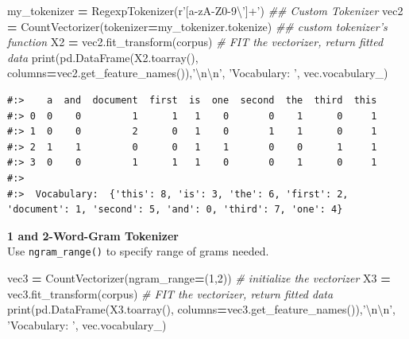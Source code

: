 \documentclass[
]{book}
\newenvironment{Shaded}{\begin{snugshade}}{\end{snugshade}}
\newcommand{\BuiltInTok}[1]{#1}
\newcommand{\CharTok}[1]{\textcolor[rgb]{0.5,0.5,0.5}{#1}}
\newcommand{\CommentTok}[1]{\textcolor[rgb]{0.37,0.37,0.37}{\textit{#1}}}
\newcommand{\DecValTok}[1]{\textcolor[rgb]{0.06,0.06,0.06}{#1}}
\newcommand{\NormalTok}[1]{#1}
\newcommand{\OperatorTok}[1]{\textcolor[rgb]{0.43,0.43,0.43}{\textbf{#1}}}
\newcommand{\StringTok}[1]{\textcolor[rgb]{0.5,0.5,0.5}{#1}}
\newcommand{\VerbatimStringTok}[1]{\textcolor[rgb]{0.5,0.5,0.5}{#1}}
\begin{document}
\begin{Shaded}
\begin{Highlighting}[]
\NormalTok{my_tokenizer }\OperatorTok{=}\NormalTok{ RegexpTokenizer(}\VerbatimStringTok{r'[a-zA-Z0-9\textbackslash{}']+'}\NormalTok{)  }\CommentTok{## Custom Tokenizer}
\NormalTok{vec2 }\OperatorTok{=}\NormalTok{ CountVectorizer(tokenizer}\OperatorTok{=}\NormalTok{my_tokenizer.tokenize) }\CommentTok{## custom tokenizer's function}
\NormalTok{X2   }\OperatorTok{=}\NormalTok{ vec2.fit_transform(corpus)  }\CommentTok{# FIT the vectorizer, return fitted data}
\BuiltInTok{print}\NormalTok{(pd.DataFrame(X2.toarray(), columns}\OperatorTok{=}\NormalTok{vec2.get_feature_names()),}\StringTok{'}\CharTok{\textbackslash{}n\textbackslash{}n}\StringTok{'}\NormalTok{,}
      \StringTok{'Vocabulary: '}\NormalTok{, vec.vocabulary_)}
\end{Highlighting}
\end{Shaded}

\begin{verbatim}
#:>    a  and  document  first  is  one  second  the  third  this
#:> 0  0    0         1      1   1    0       0    1      0     1
#:> 1  0    0         2      0   1    0       1    1      0     1
#:> 2  1    1         0      0   1    1       0    0      1     1
#:> 3  0    0         1      1   1    0       0    1      0     1 
#:> 
#:>  Vocabulary:  {'this': 8, 'is': 3, 'the': 6, 'first': 2, 'document': 1, 'second': 5, 'and': 0, 'third': 7, 'one': 4}
\end{verbatim}

\textbf{1 and 2-Word-Gram Tokenizer}\\
Use \texttt{ngram\_range()} to specify range of grams needed.

\begin{Shaded}
\begin{Highlighting}[]
\NormalTok{vec3 }\OperatorTok{=}\NormalTok{ CountVectorizer(ngram_range}\OperatorTok{=}\NormalTok{(}\DecValTok{1}\NormalTok{,}\DecValTok{2}\NormalTok{))          }\CommentTok{# initialize the vectorizer}
\NormalTok{X3   }\OperatorTok{=}\NormalTok{ vec3.fit_transform(corpus)     }\CommentTok{# FIT the vectorizer, return fitted data}
\BuiltInTok{print}\NormalTok{(pd.DataFrame(X3.toarray(), columns}\OperatorTok{=}\NormalTok{vec3.get_feature_names()),}\StringTok{'}\CharTok{\textbackslash{}n\textbackslash{}n}\StringTok{'}\NormalTok{,}
      \StringTok{'Vocabulary: '}\NormalTok{, vec.vocabulary_)}
\end{Highlighting}
\end{Shaded}
\end{document}
